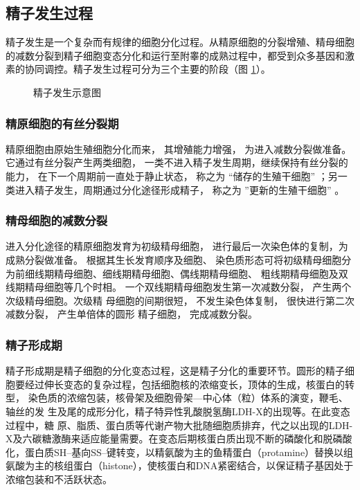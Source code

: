 \subsection{精子发生过程}

精子发生是一个复杂而有规律的细胞分化过程。从精原细胞的分裂增殖、精母细胞的减数分裂到精子细胞变态分化和运行至附睾的成熟过程中，都受到众多基因和激素的协同调控。精子发生过程可分为三个主要的阶段（图 \ref{figure_spermatogenesis}）。

\begin{figure}
\centering
\myFigurePlaceholder
\caption{精子发生示意图}
\label{figure_spermatogenesis}
\end{figure}

\subsubsection{精原细胞的有丝分裂期}

精原细胞由原始生殖细胞分化而来， 其增殖能力增强， 为进入减数分裂做准备。它通过有丝分裂产生两类细胞， 一类不进入精子发生周期，继续保持有丝分裂的能力， 在下一个周期前一直处于静止状态， 称之为 “储存的生殖干细胞” ；另一类进入精子发生，周期通过分化途径形成精子， 称之为 ”更新的生殖干细胞” 。

\subsubsection{精母细胞的减数分裂}

进入分化途径的精原细胞发育为初级精母细胞， 进行最后一次染色体的复制，为成熟分裂做准备。 根据其生长发育顺序及细胞、 染色质形态可将初级精母细胞分为前细线期精母细胞、细线期精母细胞、偶线期精母细胞、 粗线期精母细胞及双线期精母细胞等几个时相。 一个双线期精母细胞发生第一次减数分裂， 产生两个次级精母细胞。次级精 母细胞的间期很短， 不发生染色体复制， 很快进行第二次减数分裂， 产生单倍体的圆形 精子细胞， 完成减数分裂。

\subsubsection{精子形成期}

精子形成期是精子细胞的分化变态过程，这是精子分化的重要环节。圆形的精子细 胞要经过伸长变态的复杂过程，包括细胞核的浓缩变长，顶体的生成，核蛋白的转型， 染色质的浓缩包装，核骨架及细胞骨架---中心体（粒）体系的演变，鞭毛、轴丝的发 生及尾的成形分化，精子特异性乳酸脱氢酶LDH-X的出现等。在此变态过程中，糖 原、脂质、蛋白质等代谢产物大批随细胞质排弃，代之以出现的LDH-X及六碳糖激酶来适应能量需要。在变态后期核蛋白质出现不断的磷酸化和脱磷酸化，蛋白质SH--基向SS--键转变，以精氨酸为主的鱼精蛋白（protamine）替换以组氨酸为主的核组蛋白（histone），使核蛋白和DNA紧密结合，以保证精子基因处于浓缩包装和不活跃状态。

